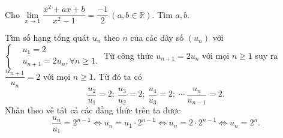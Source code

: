 \begin{ex}%
	Cho $\lim\limits_{x \to 1} \dfrac{x^2+a x+b}{x^2-1}=\dfrac{-1}{2}\,(a, b \in \mathbb{R})$. Tìm $a,b$.
\end{ex}

\begin{bt}%
	Tìm số hạng tổng quát $u_n$ theo $n$ của các dãy số $(u_n)$ với $\left\{\begin{aligned}&u_1=2 \\&u_{n+1}=2u_n, \forall n\geq 1.\end{aligned}\right.$
	\loigiai
	{
		Từ công thức $u_{n+1}=2u_n$ với mọi $n\geq 1$ suy ra $\dfrac{u_{n+1}}{u_n}=2$ với mọi $n\geq 1$. Từ đó ta có
			$$\dfrac{u_2}{u_1} =2;\ \dfrac{u_3}{u_2} =2;\ \dfrac{u_4}{u_3} =2;\ 			\cdots\ \dfrac{u_n}{u_{n-1}} =2.$$
		Nhân theo vế tất cả các đẳng thức trên ta được
		\[\dfrac{u_n}{u_1} = 2^{n-1} \Leftrightarrow u_n=u_1\cdot 2^{n-1} \Leftrightarrow u_n = 2\cdot 2^{n-1} \Leftrightarrow u_n=2^n.\]
	}
\end{bt}

